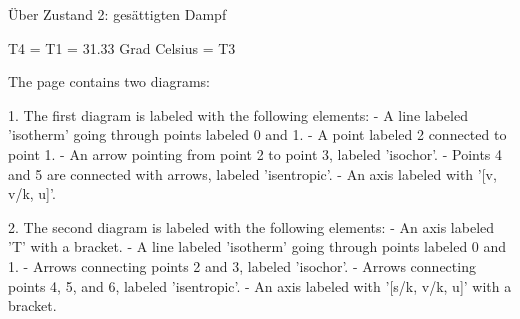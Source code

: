 Über Zustand 2: gesättigten Dampf

T4 = T1 = 31.33 Grad Celsius = T3

The page contains two diagrams:

1. The first diagram is labeled with the following elements:
   - A line labeled 'isotherm' going through points labeled 0 and 1.
   - A point labeled 2 connected to point 1.
   - An arrow pointing from point 2 to point 3, labeled 'isochor'.
   - Points 4 and 5 are connected with arrows, labeled 'isentropic'.
   - An axis labeled with '[v, v/k, u]'.

2. The second diagram is labeled with the following elements:
   - An axis labeled 'T' with a bracket.
   - A line labeled 'isotherm' going through points labeled 0 and 1.
   - Arrows connecting points 2 and 3, labeled 'isochor'.
   - Arrows connecting points 4, 5, and 6, labeled 'isentropic'.
   - An axis labeled with '[s/k, v/k, u]' with a bracket.